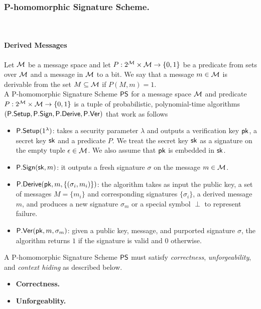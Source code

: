 \documentclass[11pt]{llncs}
\begin{document}
\subsubsection{P-homomorphic Signature Scheme.} %
\ \\
\paragraph{Derived Messages}
Let ${\cal M}$ be a message space and let $P: 2^{{\cal M}} \times {\cal M} \to \{0,1\}$ be
a predicate from sets over ${\cal M}$ and a message in
${\cal M}$ to a bit. We say that a message $m \in {\cal M}$
is derivable from the set $M \subseteq {\cal M}$ if $P(M,m) = 1$. \\


A P-homomorphic Signature Scheme ${\sf PS}$ for a message space ${\cal M}$ and predicate
$P: 2^{{\cal M}} \times {\cal M} \to \{0,1\}$ is a tuple of probabilistic, polynomial-time algorithms
$({\sf P.Setup}, {\sf P.Sign}, {\sf P.Derive}, {\sf P.Ver})$ that work as follows
\begin{itemize}
\item ${\sf P.Setup}(1^\lambda)$: takes a security parameter $\lambda$ and outputs a 
verification key ${\sf pk}$, a secret key ${\sf sk}$ and a predicate $P$.
We treat the secret key ${\sf sk}$ as a signature on the empty tuple $\epsilon \in {\cal M}$.
We also assume that ${\sf pk}$ is embedded in ${\sf sk}$.


\item ${\sf P.Sign}({\sf sk}, m)$: it outputs a fresh signature $\sigma$ on the message $m \in {\cal M}$.

\item ${\sf P.Derive}({\sf pk}, m, \lbrace (\sigma_i, m_i) \rbrace)$: the algorithm takes as input the public key, a set of messages $M= \lbrace m_i \rbrace$ and corresponding signatures $\lbrace \sigma_i \rbrace$, a derived message $m$, and produces a new signature $\sigma_m$ or a special symbol $\perp$ to represent failure. 

\item ${\sf P.Ver}({\sf pk}, m, \sigma_m)$: given a public key, message, and purported signature $\sigma$, the algorithm returns $1$
if the signature is valid and $0$ otherwise.
\end{itemize}

A P-homomorphic Signature Scheme ${\sf PS}$ must satisfy {\em correctness}, {\em unforgeability},  and {\em context hiding}
as described below. 
\begin{itemize}

\item \textbf{Correctness.} 
%



\item \textbf{Unforgeablity.} 
\end{itemize}
\end{document}
